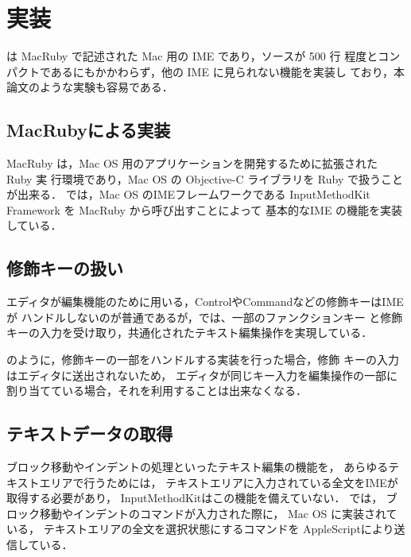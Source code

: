 \section{実装}

{\system} は MacRuby で記述された Mac 用の IME であり，ソースが 500 行
程度とコンパクトであるにもかかわらず，他の IME に見られない機能を実装し
ており，本論文のような実験も容易である．

\subsection{MacRubyによる実装}

MacRuby は，Mac OS 用のアプリケーションを開発するために拡張された Ruby 実
行環境であり，Mac OS の Objective-C ライブラリを Ruby で扱うことが出来る．
%
{\system} では，Mac OS のIMEフレームワークである
InputMethodKit Framework を MacRuby から呼び出すことによって
基本的なIME の機能を実装している．

\subsection{修飾キーの扱い}

エディタが編集機能のために用いる，ControlやCommandなどの修飾キーはIMEが
ハンドルしないのが普通であるが，{\system}では、一部のファンクションキー
と修飾キーの入力を受け取り，共通化されたテキスト編集操作を実現している．

{\system} のように，修飾キーの一部をハンドルする実装を行った場合，修飾
キーの入力はエディタに送出されないため，
エディタが同じキー入力を編集操作の一部に割り当てている場合，それを利用することは出来なくなる．

\subsection{テキストデータの取得}

ブロック移動やインデントの処理といったテキスト編集の機能を，
あらゆるテキストエリアで行うためには，
テキストエリアに入力されている全文をIMEが取得する必要があり，
InputMethodKitはこの機能を備えていない．
%
{\system} では，
ブロック移動やインデントのコマンドが入力された際に，
Mac OS に実装されている，
テキストエリアの全文を選択状態にするコマンドを
AppleScriptにより送信している．

